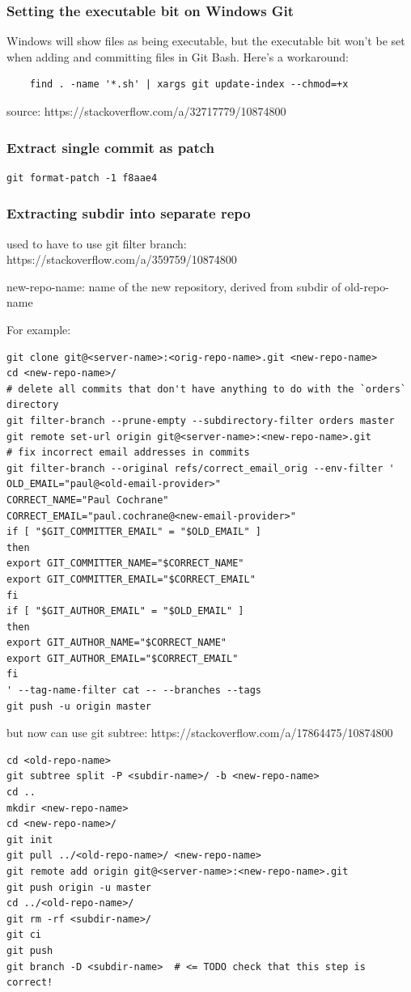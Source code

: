 \documentclass{git_course}
\begin{document}
\begin{frame}[fragile]
\frametitle{Setting the executable bit on Windows Git}
Windows will show files as being executable, but the executable bit won't be
set when adding and committing files in Git Bash.  Here's a workaround:
    \begin{lstlisting}
    find . -name '*.sh' | xargs git update-index --chmod=+x
    \end{lstlisting}
    source: https://stackoverflow.com/a/32717779/10874800
\end{frame}

\begin{frame}[fragile]
\frametitle{Extract single commit as patch}
\begin{lstlisting}
git format-patch -1 f8aae4
\end{lstlisting}
\end{frame}

\begin{frame}[fragile]
\frametitle{Extracting subdir into separate repo}
used to have to use git filter branch:
    https://stackoverflow.com/a/359759/10874800

    new-repo-name: name of the new repository, derived from subdir of
    old-repo-name

For example:
    \begin{lstlisting}
git clone git@<server-name>:<orig-repo-name>.git <new-repo-name>
cd <new-repo-name>/
# delete all commits that don't have anything to do with the `orders` directory
git filter-branch --prune-empty --subdirectory-filter orders master
git remote set-url origin git@<server-name>:<new-repo-name>.git
# fix incorrect email addresses in commits
git filter-branch --original refs/correct_email_orig --env-filter '
OLD_EMAIL="paul@<old-email-provider>"
CORRECT_NAME="Paul Cochrane"
CORRECT_EMAIL="paul.cochrane@<new-email-provider>"
if [ "$GIT_COMMITTER_EMAIL" = "$OLD_EMAIL" ]
then
export GIT_COMMITTER_NAME="$CORRECT_NAME"
export GIT_COMMITTER_EMAIL="$CORRECT_EMAIL"
fi
if [ "$GIT_AUTHOR_EMAIL" = "$OLD_EMAIL" ]
then
export GIT_AUTHOR_NAME="$CORRECT_NAME"
export GIT_AUTHOR_EMAIL="$CORRECT_EMAIL"
fi
' --tag-name-filter cat -- --branches --tags
git push -u origin master
    \end{lstlisting}

but now can use git subtree:
    https://stackoverflow.com/a/17864475/10874800

\begin{lstlisting}
cd <old-repo-name>
git subtree split -P <subdir-name>/ -b <new-repo-name>
cd ..
mkdir <new-repo-name>
cd <new-repo-name>/
git init
git pull ../<old-repo-name>/ <new-repo-name>
git remote add origin git@<server-name>:<new-repo-name>.git
git push origin -u master
cd ../<old-repo-name>/
git rm -rf <subdir-name>/
git ci
git push
git branch -D <subdir-name>  # <= TODO check that this step is correct!
\end{lstlisting}
\end{frame}
\end{document}
